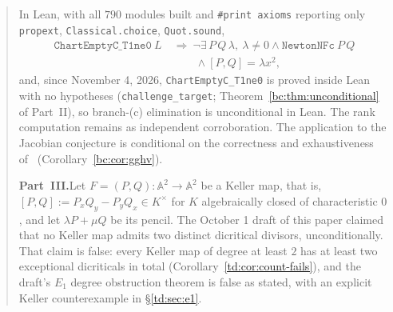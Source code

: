 \documentclass[a4paper,11pt]{article}
\theoremstyle{plain}
\theoremstyle{definition}
\theoremstyle{remark}
\begin{document}
\begin{abstract}
In Lean, with all $790$ modules built and \texttt{\#print axioms} reporting only \texttt{propext}, \texttt{Classical.choice}, \texttt{Quot.sound},
\[
\begin{aligned}
\texttt{ChartEmptyC\_T1ne0}\ L\ &\Rightarrow\
\lnot\exists\,P\,Q\,\lambda,\ \lambda\ne0\land\texttt{NewtonNFc}\ P\,Q \\
&\qquad\land[P,Q]=\lambda x^2,
\end{aligned}
\]
and, since November 4, 2026, \texttt{ChartEmptyC\_T1ne0} is proved inside Lean with no hypotheses (\texttt{challenge\_target}; Theorem~\ref{bc:thm:unconditional} of Part~II), so branch-(c) elimination is unconditional in Lean. The rank computation remains as independent corroboration. The application to the Jacobian conjecture is conditional on the correctness and exhaustiveness of~\cite[Proposition~4.3]{GGHV} (Corollary~\ref{bc:cor:gghv}).

\medskip

\textbf{Part~III.}\enspace Let $F = (P,Q) \colon \mathbb{A}^2 \to \mathbb{A}^2$ be a Keller map, that is,
$[P,Q] := P_x Q_y - P_y Q_x \in K^\times$ for $K$ algebraically closed of characteristic $0$,
and let $\lambda P + \mu Q$ be its pencil. The October 1 draft of this paper claimed that no
Keller map admits two distinct dicritical divisors, unconditionally. That claim is false: every
Keller map of degree at least $2$ has at least two exceptional dicriticals in total
(Corollary~\ref{td:cor:count-fails}), and the draft's $E_1$ degree obstruction
theorem is false as stated, with an explicit Keller
counterexample in \S\ref{td:sec:e1}.


\end{abstract}
\end{document}
